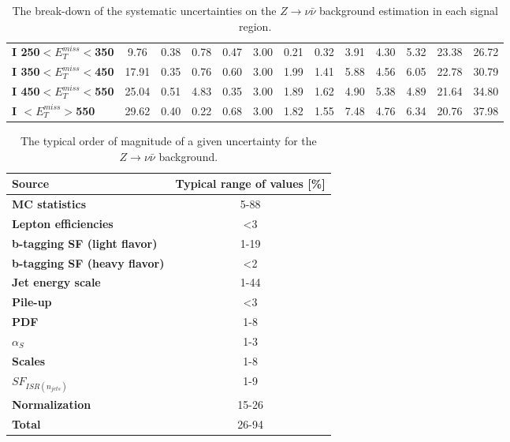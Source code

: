 \begin{table}[h]
\begin{center}
{\begin{tabular}{|l|cccccccccccc|}
\textbf{ I 250$<E_T^{miss}<$350}         & 9.76          & 0.38          & 0.78          & 0.47          & 3.00          & 0.21          & 0.32          & 3.91          & 4.30          & 5.32          & 23.38         & 26.72         \\
\textbf{ I 350$<E_T^{miss}<$450}         & 17.91         & 0.35          & 0.76          & 0.60          & 3.00          & 1.99          & 1.41          & 5.88          & 4.56          & 6.05          & 22.78         & 30.79         \\
\textbf{ I 450$<E_T^{miss}<$550}         & 25.04         & 0.51          & 4.83          & 0.35          & 3.00          & 1.89          & 1.62          & 4.90          & 5.38          & 4.89          & 21.64         & 34.80         \\
\textbf{ I $<E_T^{miss}>$550}    & 29.62         & 0.40          & 0.22          & 0.68          & 3.00          & 1.82          & 1.55          & 7.48          & 4.76          & 6.34          & 20.76         & 37.98         \\
\hline
\end{tabular}}
\caption[Table caption text]{The break-down of the systematic uncertainties on the $Z \to \nu \bar{\nu}$ background estimation in each signal region.   }
\label{tab:SysZnunu}
\end{center}
\end{table}


\begin{table}[h]
\begin{center}
\begin{tabular}{|l|c|}
\hline
\textbf{Source}       & \textbf{Typical range of values} [\%]                       \\
\hline
\textbf{MC statistics}      &  5-88   \\
\hline
\textbf{Lepton efficiencies}              &  <3  \\
\textbf{b-tagging SF (light flavor)}      &  1-19  \\
\textbf{b-tagging SF (heavy flavor)}      &  <2  \\
\textbf{Jet energy scale}                 &  1-44  \\
\textbf{Pile-up}                          &  <3  \\
\hline
\textbf{PDF}                 &  1-8  \\
\textbf{$\alpha_{S}$}                 &  1-3  \\
\textbf{Scales}                 &  1-8  \\
\textbf{$SF_{ISR(n_{jets})}$}                 &  1-9  \\
\textbf{Normalization}                 &  15-26  \\
\hline
\textbf{Total}                 &  26-94  \\
\hline
\end{tabular}
\caption[Table caption text]{The typical order of magnitude of a given uncertainty for the $Z \to \nu \bar{\nu}$ background.  }
\label{tab:SysZnunuSum}
\end{center}
\end{table}


